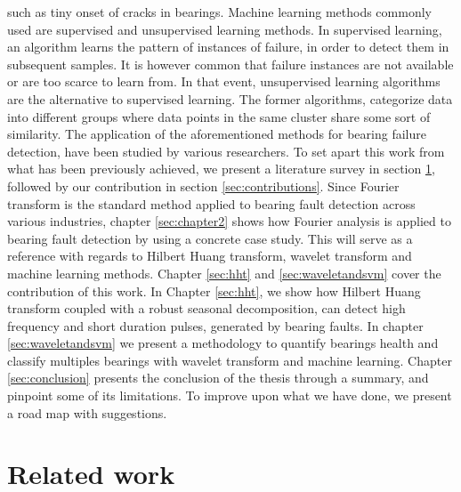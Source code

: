 \documentclass[../Main/thesis.tex]{subfiles}
\begin{document}
such as tiny onset of cracks in bearings.
\justify
Machine learning methods commonly used are supervised and unsupervised learning methods. In supervised learning, an algorithm learns the pattern of instances of failure, in order to detect them in subsequent samples. It is however common that failure instances are not available or are too scarce to learn from. In that event, unsupervised learning algorithms are the alternative to supervised learning. The former algorithms, categorize data into different groups where data points in the same cluster share some sort of similarity.
\justify
 The application of the aforementioned methods for bearing failure detection, have been studied by various researchers. 
To set apart this work from what has been previously achieved, we present a literature survey in section \ref{sec:relatedwork}, followed by our contribution in section \ref{sec:contributions}. Since Fourier transform is the standard method applied to bearing fault detection across various industries, chapter \ref{sec:chapter2} shows how Fourier analysis is applied to bearing fault detection by using a concrete case study. This will serve as a reference with regards to Hilbert Huang transform, wavelet transform and machine learning methods.
\justify
Chapter \ref{sec:hht} and \ref{sec:waveletandsvm} cover the contribution of this work. In Chapter \ref{sec:hht}, we show how Hilbert Huang transform coupled with a robust seasonal decomposition, can detect high frequency and short duration pulses, generated by bearing faults. In chapter \ref{sec:waveletandsvm} we present a methodology to quantify bearings health and classify multiples bearings with wavelet transform and machine learning. Chapter \ref{sec:conclusion} presents the conclusion of the thesis through a summary, and pinpoint some of its limitations. To improve upon what we have done, we present a road map with suggestions.

\section{Related work}
\label{sec:relatedwork}



\end{document}
